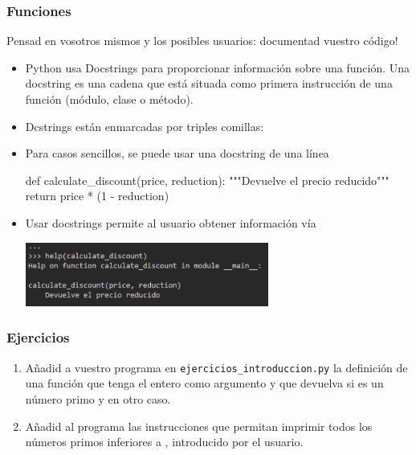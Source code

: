 \documentclass[handout,9pt]{beamer}
\begin{document}
\begin{frame}[fragile]
  \frametitle{Funciones}
  \begin{block}{}
    Pensad en vosotros mismos y los posibles usuarios: documentad
    vuestro código!
  \end{block}\pause
  \begin{itemize}
  \item<2->   Python usa  Docstrings para proporcionar información
    sobre una función. Una docstring es una cadena que está situada
    como primera instrucción de una función (módulo, clase o método).
\item<3-> Dcstrings están enmarcadas por triples comillas:
\item<4-> Para casos sencillos, se puede usar una docstring de una línea
  {\footnotesize
  \begin{pyverbatim}
def calculate_discount(price, reduction):
    """Devuelve el precio reducido"""
    return price * (1 - reduction)
  \end{pyverbatim}
  }
\item<5-> Usar docstrings permite al usuario obtener información vía
  \begin{center}
\includegraphics[width=8cm]{../figures/help_function_es}
\end{center}

\end{itemize}
\end{frame}

\begin{frame}[fragile]
  \frametitle{Ejercicios}
  \begin{enumerate}
  \item Añadid a vuestro programa en {\tt ejercicios\_introduccion.py}
    la definición de una función que tenga el entero  como
    argumento y que devuelva  si  es un número primo
    y   en otro caso.
  \item Añadid al programa las instrucciones que permitan imprimir
    todos los números primos inferiores a , introducido por el usuario.
  \end{enumerate}  
\end{frame}
\end{document}
